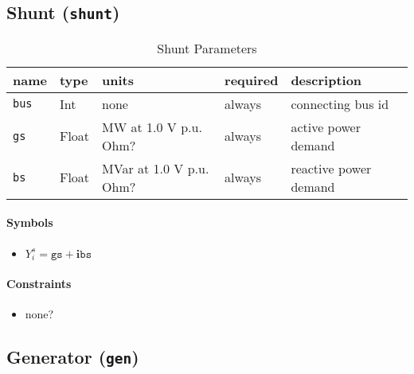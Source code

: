 \documentclass{article}
\begin{document}
\subsection{Shunt (\texttt{shunt})}

\begin{table}[h]
\centering
\caption{Shunt Parameters}
\begin{tabular}{|l|l|l|l|p{7cm}|}
\hline
name & type & units & required & description \\ 
\hline
\hline
\texttt{bus} & Int & none & always & connecting bus id \\ 
\hline
\texttt{gs} & Float & MW at 1.0 V p.u. {\color{red} Ohm?} & always & active power demand  \\ 
\hline
\texttt{bs} & Float & MVar at 1.0 V p.u. {\color{red} Ohm?} & always & reactive power demand  \\ 
\hline
\end{tabular}
\label{tbl:shunt}
\end{table}

\paragraph{Symbols}
\begin{itemize}
    \item $Y^s_i = \texttt{gs} + \bm i \texttt{bs}$
\end{itemize}

\paragraph{Constraints}
\begin{itemize}
    \item none?
\end{itemize}



\subsection{Generator (\texttt{gen})}
\end{document}

